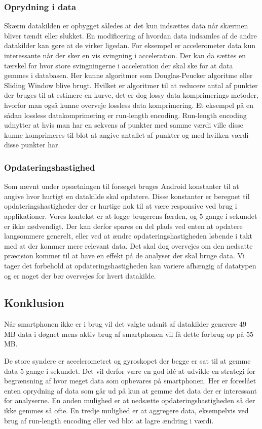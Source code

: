 \subsubsection{Oprydning i data}\label{sec:opryd}
Skærm datakilden er opbygget således at det kun indsættes data når skærmen bliver tændt eller slukket.
En modificering af hvordan data indsamles af de andre datakilder kan gøre at de virker ligedan. 
For eksempel er accelerometer data kun interessante når der sker en vis svingning i acceleration.
Der kan da sættes en tærskel for hvor store svingningerne i acceleration der skal ske for at data gemmes i databasen.
Her kunne algoritmer som Douglas-Peucker algoritme eller Sliding Window blive brugt.
Hvilket er algoritmer til at reducere antal af punkter der bruges til at estimere en kurve, det er dog lossy data komprimerings metoder, hvorfor man også kunne overveje lossless data komprimering.
Et eksempel på en sådan lossless datakomprimering er run-length encoding.
Run-length encoding udnytter at hvis man har en sekvens af punkter med samme værdi ville disse kunne komprimeres til blot at angive antallet af punkter og med hvilken værdi disse punkter har.

\subsubsection{Opdateringshastighed}
Som nævnt under opsætningen til forsøget bruges Android konstanter til at angive hvor hurtigt en datakilde skal opdatere.
Disse konstanter er beregnet til opdateringshastigheder der er hurtige nok til at være responsive ved brug i applikationer.
Vores kontekst er at logge brugerens færden, og 5 gange i sekundet er ikke nødvendigt.
Der kan derfor spares en del plads ved enten at opdatere langsommere generelt, eller ved at ændre opdateringshastigheden løbende i takt med at der kommer mere relevant data.
Det skal dog overvejes om den nedsatte præcision kommer til at have en effekt på de analyser der skal bruge data.
Vi tager det forbehold at opdateringshastigheden kan variere afhængig af datatypen og er noget der bør overvejes for hvert datakilde.

\subsection{Konklusion}
Når smartphonen ikke er i brug vil det valgte udsnit af datakilder generere 49 MB data i døgnet mens aktiv brug af smartphonen vil få dette forbrug op på 55 MB.

De store syndere er accelerometret og gyroskopet der begge er sat til at gemme data 5 gange i sekundet.
Det vil derfor være en god idé at udvikle en strategi for begrænsning af hvor meget data som opbevares på smartphonen.
Her er foreslået enten oprydning af data som går ud på kun at gemme det data der er interessant for analyserne.
En anden mulighed er at nedsætte opdateringshastigheden så der ikke gemmes så ofte.
En tredje mulighed er at aggregere data, eksempelvis ved brug af run-length encoding eller ved blot at lagre ændring i værdi.

